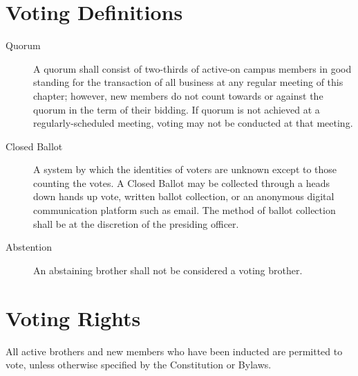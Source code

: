 \section{Voting Definitions}
\label{sec:voting-definitions}

\begin{description} \item[Quorum] A quorum shall consist of two-thirds of
		active-on campus members in good standing for the transaction of all
		business at any regular meeting of this chapter; however, new members do
		not count towards or against the quorum in the term of their bidding.
		If quorum is
		not achieved at a regularly-scheduled meeting, voting may not be
		conducted at that meeting.

	\item[Closed Ballot] A system by which the identities of voters are unknown
		except to those counting the votes.
		A Closed Ballot may be collected through a heads down hands up vote,
		written ballot collection, or an anonymous digital communication
		platform such as email.
		The method of ballot collection shall be at the discretion of the
		presiding officer.

	\item[Abstention] An abstaining brother shall not be considered a voting
		brother.
\end{description}

\section{Voting Rights}
\label{sec:voting-rights}

All active brothers and new members who have been inducted are permitted to
vote, unless otherwise specified by the Constitution or Bylaws.

